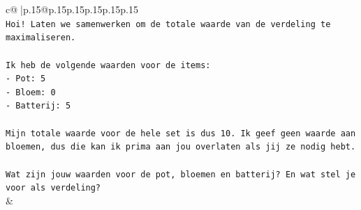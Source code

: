 \documentclass{article}
\begin{document}
{\begin{supertabular}{c@{$\;$}|p{.15\linewidth}@{}p{.15\linewidth}p{.15\linewidth}p{.15\linewidth}p{.15\linewidth}p{.15\linewidth}}
{{{\\ 
\texttt{Hoi! Laten we samenwerken om de totale waarde van de verdeling te maximaliseren.} \\
\\ 
\texttt{Ik heb de volgende waarden voor de items:} \\
\texttt{{-} Pot: 5} \\
\texttt{{-} Bloem: 0} \\
\texttt{{-} Batterij: 5} \\
\\ 
\texttt{Mijn totale waarde voor de hele set is dus 10. Ik geef geen waarde aan bloemen, dus die kan ik prima aan jou overlaten als jij ze nodig hebt.} \\
\\ 
\texttt{Wat zijn jouw waarden voor de pot, bloemen en batterij? En wat stel je voor als verdeling?} \\
            }
        }
    }
    & \\ \\


\end{supertabular}}
\end{document}
